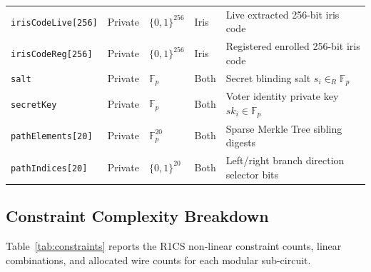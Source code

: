 \documentclass[10pt,letterpaper,journal]{IEEEtran}
\begin{document}
\begin{table}[t]
{\begin{tabular}{@{}llllp{3.2cm}@{}}
\texttt{irisCodeLive[256]}& Private & $\{0,1\}^{256}$ & Iris & Live extracted 256-bit iris code \\
\texttt{irisCodeReg[256]} & Private & $\{0,1\}^{256}$ & Iris & Registered enrolled 256-bit iris code \\
\texttt{salt}            & Private & $\mathbb{F}_p$ & Both & Secret blinding salt $s_i \in_R \mathbb{F}_p$ \\
\texttt{secretKey}       & Private & $\mathbb{F}_p$ & Both & Voter identity private key $sk_i \in \mathbb{F}_p$ \\
\texttt{pathElements[20]}& Private & $\mathbb{F}_p^{20}$ & Both & Sparse Merkle Tree sibling digests \\
\texttt{pathIndices[20]} & Private & $\{0,1\}^{20}$ & Both & Left/right branch direction selector bits \\
\bottomrule
\end{tabular}%
}
\end{table}

\subsection{Constraint Complexity Breakdown}
\label{sec:supp-constraints}
Table~\ref{tab:constraints} reports the R1CS non-linear constraint counts, linear combinations, and allocated wire counts for each modular sub-circuit.
\end{document}

